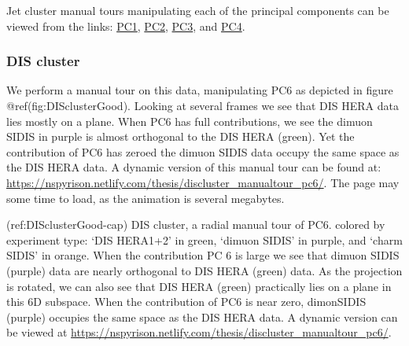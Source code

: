 Jet cluster manual tours manipulating each of the principal components can be viewed from the links: \href{https://nspyrison.netlify.com/thesis/jetcluster_manualtour_pc1/}{PC1}, \href{https://nspyrison.netlify.com/thesis/jetcluster_manualtour_pc2/}{PC2}, \href{https://nspyrison.netlify.com/thesis/jetcluster_manualtour_pc3/}{PC3}, and \href{https://nspyrison.netlify.com/thesis/jetcluster_manualtour_pc4/}{PC4}.

\hypertarget{dis-cluster}{%
\subsubsection{DIS cluster}\label{dis-cluster}}

We perform a manual tour on this data, manipulating PC6 as depicted in figure @ref(fig:DISclusterGood). Looking at several frames we see that DIS HERA data lies mostly on a plane. When PC6 has full contributions, we see the dimuon SIDIS in purple is almost orthogonal to the DIS HERA (green). Yet the contribution of PC6 has zeroed the dimuon SIDIS data occupy the same space as the DIS HERA data. A dynamic version of this manual tour can be found at:
\url{https://nspyrison.netlify.com/thesis/discluster_manualtour_pc6/}.
The page may some time to load, as the animation is several megabytes.

(ref:DISclusterGood-cap) DIS cluster, a radial manual tour of PC6. colored by experiment type: `DIS HERA1+2' in green, `dimuon SIDIS' in purple, and `charm SIDIS' in orange. When the contribution PC 6 is large we see that dimuon SIDIS (purple) data are nearly orthogonal to DIS HERA (green) data. As the projection is rotated, we can also see that DIS HERA (green) practically lies on a plane in this 6D subspace. When the contribution of PC6 is near zero, dimonSIDIS (purple) occupies the same space as the DIS HERA data. A dynamic version can be viewed at \url{https://nspyrison.netlify.com/thesis/discluster_manualtour_pc6/}.

